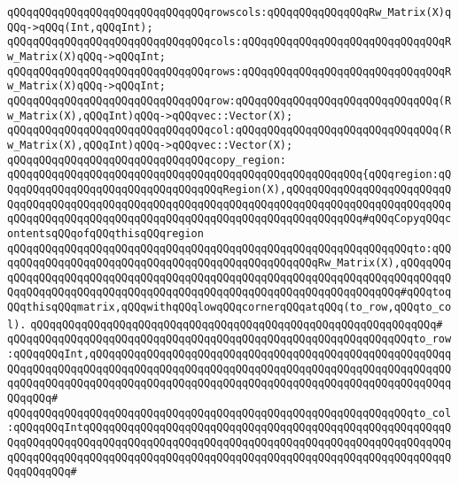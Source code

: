 \newline
\verb|qQQqqQQqqQQqqQQqqQQqqQQqqQQqqQQqrowscols:qQQqqQQqqQQqqQQqRw_Matrix(X)qQQq->qQQq(Int,qQQqInt);|\newline
\verb|qQQqqQQqqQQqqQQqqQQqqQQqqQQqqQQqcols:qQQqqQQqqQQqqQQqqQQqqQQqqQQqqQQqRw_Matrix(X)qQQq->qQQqInt;|\newline
\verb|qQQqqQQqqQQqqQQqqQQqqQQqqQQqqQQqrows:qQQqqQQqqQQqqQQqqQQqqQQqqQQqqQQqRw_Matrix(X)qQQq->qQQqInt;|\newline
\newline
\verb|qQQqqQQqqQQqqQQqqQQqqQQqqQQqqQQqrow:qQQqqQQqqQQqqQQqqQQqqQQqqQQqqQQq(Rw_Matrix(X),qQQqInt)qQQq->qQQqvec::Vector(X);|\newline
\verb|qQQqqQQqqQQqqQQqqQQqqQQqqQQqqQQqcol:qQQqqQQqqQQqqQQqqQQqqQQqqQQqqQQq(Rw_Matrix(X),qQQqInt)qQQq->qQQqvec::Vector(X);|\newline
\newline
\verb|qQQqqQQqqQQqqQQqqQQqqQQqqQQqqQQqcopy_region:|\newline
\verb|qQQqqQQqqQQqqQQqqQQqqQQqqQQqqQQqqQQqqQQqqQQqqQQqqQQqqQQq{qQQqregion:qQQqqQQqqQQqqQQqqQQqqQQqqQQqqQQqqQQqRegion(X),qQQqqQQqqQQqqQQqqQQqqQQqqQQqqQQqqQQqqQQqqQQqqQQqqQQqqQQqqQQqqQQqqQQqqQQqqQQqqQQqqQQqqQQqqQQqqQQqqQQqqQQqqQQqqQQqqQQqqQQqqQQqqQQqqQQqqQQqqQQqqQQqqQQqqQQq#qQQqCopyqQQqcontentsqQQqofqQQqthisqQQqregion|\newline
\verb|qQQqqQQqqQQqqQQqqQQqqQQqqQQqqQQqqQQqqQQqqQQqqQQqqQQqqQQqqQQqqQQqto:qQQqqQQqqQQqqQQqqQQqqQQqqQQqqQQqqQQqqQQqqQQqqQQqqQQqRw_Matrix(X),qQQqqQQqqQQqqQQqqQQqqQQqqQQqqQQqqQQqqQQqqQQqqQQqqQQqqQQqqQQqqQQqqQQqqQQqqQQqqQQqqQQqqQQqqQQqqQQqqQQqqQQqqQQqqQQqqQQqqQQqqQQqqQQqqQQqqQQqqQQq#qQQqtoqQQqthisqQQqmatrix,qQQqwithqQQqlowqQQqcornerqQQqatqQQq(to_row,qQQqto_col).|\newline
\verb|qQQqqQQqqQQqqQQqqQQqqQQqqQQqqQQqqQQqqQQqqQQqqQQqqQQqqQQqqQQqqQQq#|\newline
\verb|qQQqqQQqqQQqqQQqqQQqqQQqqQQqqQQqqQQqqQQqqQQqqQQqqQQqqQQqqQQqqQQqto_row:qQQqqQQqInt,qQQqqQQqqQQqqQQqqQQqqQQqqQQqqQQqqQQqqQQqqQQqqQQqqQQqqQQqqQQqqQQqqQQqqQQqqQQqqQQqqQQqqQQqqQQqqQQqqQQqqQQqqQQqqQQqqQQqqQQqqQQqqQQqqQQqqQQqqQQqqQQqqQQqqQQqqQQqqQQqqQQqqQQqqQQqqQQqqQQqqQQqqQQqqQQqqQQqqQQqqQQq#|\newline
\verb|qQQqqQQqqQQqqQQqqQQqqQQqqQQqqQQqqQQqqQQqqQQqqQQqqQQqqQQqqQQqqQQqto_col:qQQqqQQqIntqQQqqQQqqQQqqQQqqQQqqQQqqQQqqQQqqQQqqQQqqQQqqQQqqQQqqQQqqQQqqQQqqQQqqQQqqQQqqQQqqQQqqQQqqQQqqQQqqQQqqQQqqQQqqQQqqQQqqQQqqQQqqQQqqQQqqQQqqQQqqQQqqQQqqQQqqQQqqQQqqQQqqQQqqQQqqQQqqQQqqQQqqQQqqQQqqQQqqQQqqQQqqQQq#|\newline
